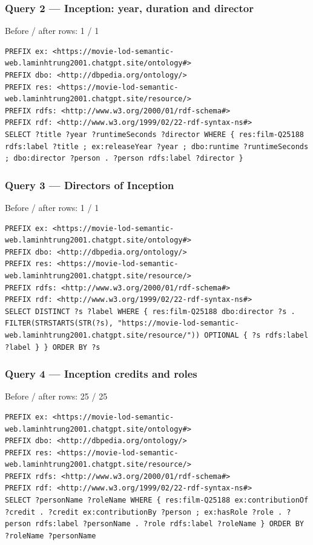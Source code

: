 \documentclass[
  11pt,
]{article}
\begin{document}
\subsubsection{Query 2 --- Inception: year, duration and
director}\label{query-2-inception-year-duration-and-director}

Before / after rows: 1 / 1

\begin{verbatim}
PREFIX ex: <https://movie-lod-semantic-web.laminhtrung2001.chatgpt.site/ontology#>
PREFIX dbo: <http://dbpedia.org/ontology/>
PREFIX res: <https://movie-lod-semantic-web.laminhtrung2001.chatgpt.site/resource/>
PREFIX rdfs: <http://www.w3.org/2000/01/rdf-schema#>
PREFIX rdf: <http://www.w3.org/1999/02/22-rdf-syntax-ns#>
SELECT ?title ?year ?runtimeSeconds ?director WHERE { res:film-Q25188 rdfs:label ?title ; ex:releaseYear ?year ; dbo:runtime ?runtimeSeconds ; dbo:director ?person . ?person rdfs:label ?director }
\end{verbatim}

\subsubsection{Query 3 --- Directors of
Inception}\label{query-3-directors-of-inception}

Before / after rows: 1 / 1

\begin{verbatim}
PREFIX ex: <https://movie-lod-semantic-web.laminhtrung2001.chatgpt.site/ontology#>
PREFIX dbo: <http://dbpedia.org/ontology/>
PREFIX res: <https://movie-lod-semantic-web.laminhtrung2001.chatgpt.site/resource/>
PREFIX rdfs: <http://www.w3.org/2000/01/rdf-schema#>
PREFIX rdf: <http://www.w3.org/1999/02/22-rdf-syntax-ns#>
SELECT DISTINCT ?s ?label WHERE { res:film-Q25188 dbo:director ?s . FILTER(STRSTARTS(STR(?s), "https://movie-lod-semantic-web.laminhtrung2001.chatgpt.site/resource/")) OPTIONAL { ?s rdfs:label ?label } } ORDER BY ?s
\end{verbatim}

\subsubsection{Query 4 --- Inception credits and
roles}\label{query-4-inception-credits-and-roles}

Before / after rows: 25 / 25

\begin{verbatim}
PREFIX ex: <https://movie-lod-semantic-web.laminhtrung2001.chatgpt.site/ontology#>
PREFIX dbo: <http://dbpedia.org/ontology/>
PREFIX res: <https://movie-lod-semantic-web.laminhtrung2001.chatgpt.site/resource/>
PREFIX rdfs: <http://www.w3.org/2000/01/rdf-schema#>
PREFIX rdf: <http://www.w3.org/1999/02/22-rdf-syntax-ns#>
SELECT ?personName ?roleName WHERE { res:film-Q25188 ex:contributionOf ?credit . ?credit ex:contributionBy ?person ; ex:hasRole ?role . ?person rdfs:label ?personName . ?role rdfs:label ?roleName } ORDER BY ?roleName ?personName
\end{verbatim}
\end{document}
